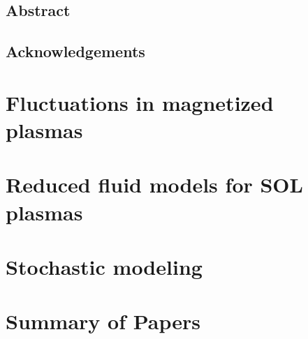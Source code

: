 \documentclass[11pt,twoside,openright]{book}
\begin{document}
  \frontmatter 


  \newpage

  \null\thispagestyle{empty}

  \newpage

  \setcounter{page}{1}\thispagestyle{empty}

  \newpage


  \section*{Abstract} 

  \newpage

  \null

  \newpage

  \section*{Acknowledgements} 

  \newpage

  \null

  \newpage

  \tableofcontents

  \mainmatter

  \chapter{Fluctuations in magnetized plasmas} 

  \chapter{Reduced fluid models for SOL plasmas} 

  \chapter{Stochastic modeling} 

  \chapter{Summary of Papers}\label{ch:sum-paper} 
\end{document}
